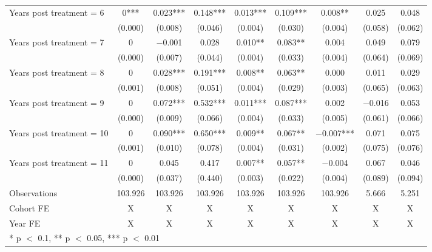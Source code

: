 \begin{table}[H]
{\begin{threeparttable}
\begin{tabular}[t]{lcccccccc}
Years post treatment = 6 & \num{0}*** & \num{ 0.023}*** & \num{ 0.148}*** & \num{ 0.013}*** & \num{ 0.109}*** & \num{ 0.008}** & \num{ 0.025} & \num{ 0.048}\\
 & (\num{0.000}) & (\num{0.008}) & (\num{0.046}) & (\num{0.004}) & (\num{0.030}) & (\num{0.004}) & (\num{0.058}) & (\num{0.062})\\
Years post treatment = 7 & \num{0} & \num{-0.001} & \num{ 0.028} & \num{ 0.010}** & \num{ 0.083}** & \num{ 0.004} & \num{ 0.049} & \num{ 0.079}\\
 & (\num{0.000}) & (\num{0.007}) & (\num{0.044}) & (\num{0.004}) & (\num{0.033}) & (\num{0.004}) & (\num{0.064}) & (\num{0.069})\\
Years post treatment = 8 & \num{0} & \num{ 0.028}*** & \num{ 0.191}*** & \num{ 0.008}** & \num{ 0.063}** & \num{ 0.000} & \num{ 0.011} & \num{ 0.029}\\
 & (\num{0.001}) & (\num{0.008}) & (\num{0.051}) & (\num{0.004}) & (\num{0.029}) & (\num{0.003}) & (\num{0.065}) & (\num{0.063})\\
Years post treatment = 9 & \num{0} & \num{ 0.072}*** & \num{ 0.532}*** & \num{ 0.011}*** & \num{ 0.087}*** & \num{ 0.002} & \num{-0.016} & \num{ 0.053}\\
 & (\num{0.000}) & (\num{0.009}) & (\num{0.066}) & (\num{0.004}) & (\num{0.033}) & (\num{0.005}) & (\num{0.061}) & (\num{0.066})\\
Years post treatment = 10 & \num{0} & \num{ 0.090}*** & \num{ 0.650}*** & \num{ 0.009}** & \num{ 0.067}** & \num{-0.007}*** & \num{ 0.071} & \num{ 0.075}\\
 & (\num{0.001}) & (\num{0.010}) & (\num{0.078}) & (\num{0.004}) & (\num{0.031}) & (\num{0.002}) & (\num{0.075}) & (\num{0.076})\\
Years post treatment = 11 & \num{0} & \num{ 0.045} & \num{ 0.417} & \num{ 0.007}** & \num{ 0.057}** & \num{-0.004} & \num{ 0.067} & \num{ 0.046}\\
 & (\num{0.000}) & (\num{0.037}) & (\num{0.440}) & (\num{0.003}) & (\num{0.022}) & (\num{0.004}) & (\num{0.089}) & (\num{0.094})\\
\midrule
Observations & \num{103,926} & \num{103,926} & \num{103,926} & \num{103,926} & \num{103,926} & \num{103,926} & \num{5,666} & \num{5,251}\\
Cohort FE & X & X & X & X & X & X & X & X\\
Year FE & X & X & X & X & X & X & X & X\\
\bottomrule
\multicolumn{9}{l}{\rule{0pt}{1em}* p $<$ 0.1, ** p $<$ 0.05, *** p $<$ 0.01}\\

\end{tabular}
\end{threeparttable}}
\end{table}
